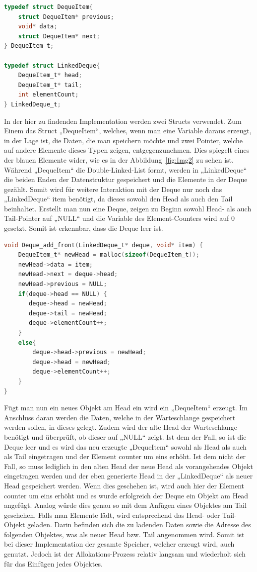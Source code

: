 \documentclass{TUBAFarbeiten}
\begin{document}
\begin{lstlisting}[language=C, frame=single, style=customc]
typedef struct DequeItem{
    struct DequeItem* previous;
    void* data;
    struct DequeItem* next;
} DequeItem_t;

typedef struct LinkedDeque{
    DequeItem_t* head;
    DequeItem_t* tail;
    int elementCount;
} LinkedDeque_t;
\end{lstlisting}
In der hier zu findenden Implementation werden zwei Structs verwendet. Zum Einem das Struct „DequeItem“, welches, wenn man eine Variable daraus erzeugt, in der Lage ist, die Daten, die man speichern möchte und zwei Pointer, welche auf andere Elemente dieses Typen zeigen, entgegenzunehmen. Dies spiegelt eines der blauen Elemente wider, wie es in der Abbildung~\ref{fig:Img2} zu sehen ist. Während „DequeItem“ die Double-Linked-List formt, werden in „LinkedDeque“ die beiden Enden der Datenstruktur gespeichert und die Elemente in der Deque gezählt. Somit wird für weitere Interaktion mit der Deque nur noch das „LinkedDeque“ item benötigt, da dieses sowohl den Head als auch den Tail beinhaltet. Erstellt man nun eine Deque, zeigen zu Beginn sowohl Head- als auch Tail-Pointer auf „NULL“ und die Variable des Element-Counters wird auf 0 gesetzt. Somit ist erkennbar, dass die Deque leer ist. 
\begin{lstlisting}[language=C, frame=single, style=customc]
void Deque_add_front(LinkedDeque_t* deque, void* item) {
    DequeItem_t* newHead = malloc(sizeof(DequeItem_t));
    newHead->data = item;
    newHead->next = deque->head;
    newHead->previous = NULL;
    if(deque->head == NULL) {
       deque->head = newHead; 
       deque->tail = newHead;
       deque->elementCount++;
    }
    else{
        deque->head->previous = newHead;
        deque->head = newHead;
        deque->elementCount++;
    }
}
\end{lstlisting}
Fügt man nun ein neues Objekt am Head ein wird ein „DequeItem“ erzeugt. Im Anschluss daran werden die Daten, welche in der Warteschlange gespeichert werden sollen, in dieses gelegt. Zudem wird der alte Head der Warteschlange benötigt und überprüft, ob dieser auf „NULL“ zeigt. Ist dem der Fall, so ist die Deque leer und es wird das neu erzeugte „DequeItem“ sowohl als Head als auch als Tail eingetragen und der Element counter um eins erhöht. Ist dem nicht der Fall, so muss lediglich in den alten Head der neue Head als vorangehendes Objekt eingetragen werden und der eben generierte Head in der „LinkedDeque“ als neuer Head gespeichert werden. Wenn dies geschehen ist, wird auch hier der Element counter um eins erhöht und es wurde erfolgreich der Deque ein Objekt am Head angefügt. Analog würde dies genau so mit dem Anfügen eines Objektes am Tail geschehen. Falls man Elemente lädt, wird entsprechend das Head- oder Tail-Objekt geladen. Darin befinden sich die zu ladenden Daten sowie die Adresse des folgenden Objektes, was als neuer Head bzw. Tail angenommen wird. Somit ist bei dieser Implementation der gesamte Speicher, welcher erzeugt wird, auch genutzt. Jedoch ist der Allokations-Prozess relativ langsam und wiederholt sich für das Einfügen jedes Objektes.
\end{document}
